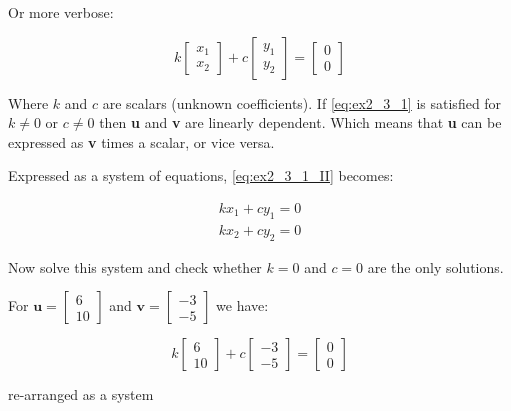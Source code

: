 Or more verbose:

\begin{equation}\label{eq:ex2_3_1_II}
k \left[\begin{matrix}x_1\\x_2\end{matrix}\right] +
c \left[\begin{matrix}y_1\\y_2\end{matrix}\right] =
\left[\begin{matrix}0\\0\end{matrix}\right]
\end{equation}

Where $k$ and $c$ are scalars (unknown coefficients). If \ref{eq:ex2_3_1} is
satisfied for $k \neq 0$ or $c \neq 0$ then \textbf{u} and \textbf{v} are
linearly dependent. Which means that \textbf{u} can be expressed as \textbf{v} times
a scalar, or vice versa.

Expressed as a system of equations, \ref{eq:ex2_3_1_II} becomes:

\begin{equation}
\begin{matrix}
kx_1 + cy_1 = 0 \\
kx_2 + cy_2 = 0
\end{matrix}
\end{equation}

Now solve this system and check whether $k=0$ and $c=0$ are the only solutions.

For $\mathbf{u} = \left[\begin{matrix}6\\10\end{matrix}\right]$  and
$\mathbf{v} = \left[\begin{matrix}-3\\-5\end{matrix}\right]$ we have:

$$
k \left[\begin{matrix}6\\10\end{matrix}\right] + c \left[\begin{matrix}-3\\-5\end{matrix}\right] = \left[\begin{matrix}0\\0\end{matrix}\right]
$$

re-arranged as a system

